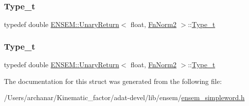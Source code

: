 \mbox{\label{structENSEM_1_1UnaryReturn_3_01float_00_01FnNorm2_01_4_a5b5cece226a8a8fa27c401904bc8948d}} 
\subsubsection{\texorpdfstring{Type\_t}{Type\_t}\hspace{0.1cm}{\footnotesize\ttfamily [2/3]}}
{\footnotesize\ttfamily typedef double \mbox{\hyperlink{structENSEM_1_1UnaryReturn}{E\+N\+S\+E\+M\+::\+Unary\+Return}}$<$ float, \mbox{\hyperlink{structENSEM_1_1FnNorm2}{Fn\+Norm2}} $>$\+::\mbox{\hyperlink{structENSEM_1_1UnaryReturn_3_01float_00_01FnNorm2_01_4_a5b5cece226a8a8fa27c401904bc8948d}{Type\+\_\+t}}}

\mbox{\label{structENSEM_1_1UnaryReturn_3_01float_00_01FnNorm2_01_4_a5b5cece226a8a8fa27c401904bc8948d}} 
\subsubsection{\texorpdfstring{Type\_t}{Type\_t}\hspace{0.1cm}{\footnotesize\ttfamily [3/3]}}
{\footnotesize\ttfamily typedef double \mbox{\hyperlink{structENSEM_1_1UnaryReturn}{E\+N\+S\+E\+M\+::\+Unary\+Return}}$<$ float, \mbox{\hyperlink{structENSEM_1_1FnNorm2}{Fn\+Norm2}} $>$\+::\mbox{\hyperlink{structENSEM_1_1UnaryReturn_3_01float_00_01FnNorm2_01_4_a5b5cece226a8a8fa27c401904bc8948d}{Type\+\_\+t}}}



The documentation for this struct was generated from the following file\+:\begin{DoxyCompactItemize}
\item 
/\+Users/archanar/\+Kinematic\+\_\+factor/adat-\/devel/lib/ensem/\mbox{\hyperlink{adat-devel_2lib_2ensem_2ensem__simpleword_8h}{ensem\+\_\+simpleword.\+h}}\end{DoxyCompactItemize}
